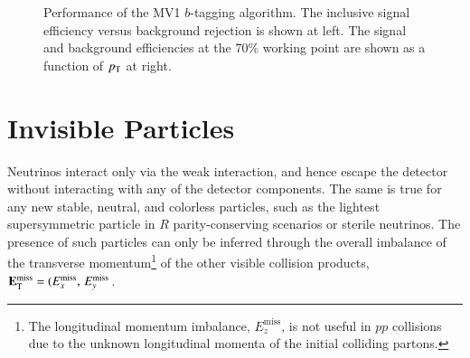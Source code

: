 \begin{figure}[htbp]
	\centering
	\hfill
	\caption{Performance of the MV1 $b$-tagging algorithm. The inclusive signal efficiency versus background rejection is shown at left. The signal and background efficiencies at the 70\% working point are shown as a function of $p_{\text{T}}$ at right.}
	\label{fig:reco-b-tagging-efficiency}
\end{figure}


\section{Invisible Particles}\label{sec:reco-met}
Neutrinos interact only via the weak interaction, and hence escape the detector without interacting with any of the detector components. The same is true for any new stable, neutral, and colorless particles, such as the lightest supersymmetric particle in $R$ parity-conserving scenarios or sterile neutrinos. The presence of such particles can only be inferred through the overall imbalance of the transverse momentum\footnote{The longitudinal momentum imbalance, $E_{z}^{\mathrm{miss}}$, is not useful in $pp$ collisions due to the unknown longitudinal momenta of the initial colliding partons.} of the other visible collision products, $\mathbf{E}_{\mathrm{T}}^{\mathrm{miss}}=(E_{x}^{\mathrm{miss}},\,E_{y}^{\mathrm{miss}}$. 

